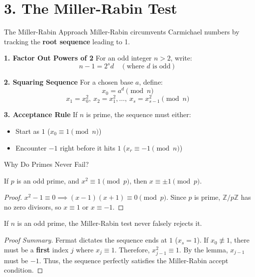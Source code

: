 \documentclass[10pt, compress]{beamer}
\begin{document}
\section{3. The Miller-Rabin Test}
\begin{frame}{The Miller-Rabin Approach}
    Miller-Rabin circumvents Carmichael numbers by tracking the \textbf{root sequence} leading to 1.
    
    \pause
    \textbf{1. Factor Out Powers of 2}
    For an odd integer $n > 2$, write:
    \[ n - 1 = 2^s d \quad (\text{where } d \text{ is odd}) \]
    
    \pause
    \textbf{2. Squaring Sequence}
    For a chosen base $a$, define:
    \[ x_0 = a^d \pmod n \]
    \[ x_1 = x_0^2, \ x_2 = x_1^2, \dots, \ x_s = x_{s-1}^2 \pmod n \]
    
    \pause
    \textbf{3. Acceptance Rule}
    If $n$ is prime, the sequence must either:
    \begin{itemize}
        \item Start as $1$ ($x_0 \equiv 1 \pmod n$)
        \item Encounter $-1$ right before it hits $1$ ($x_r \equiv -1 \pmod n$)
    \end{itemize}
\end{frame}
\begin{frame}{Why Do Primes Never Fail?}
    \begin{lemma}
    If $p$ is an odd prime, and $x^2 \equiv 1 \pmod p$, then $x \equiv \pm 1 \pmod p$.
    \end{lemma}
    
    \pause
    \begin{proof}
        $x^2 - 1 \equiv 0 \implies (x-1)(x+1) \equiv 0 \pmod p$. Since $p$ is prime, $\mathbb{Z}/p\mathbb{Z}$ has no zero divisors, so $x \equiv 1$ or $x \equiv -1$.
    \end{proof}
    
    \pause
    \begin{theorem}
    If $n$ is an odd prime, the Miller-Rabin test never falsely rejects it.
    \end{theorem}
    \pause
    \begin{proof}[Proof Summary]
        Fermat dictates the sequence ends at $1$ ($x_s = 1$). If $x_0 \not\equiv 1$, there must be a \textbf{first} index $j$ where $x_j \equiv 1$. Therefore, $x_{j-1}^2 \equiv 1$. By the lemma, $x_{j-1}$ must be $-1$. Thus, the sequence perfectly satisfies the Miller-Rabin accept condition.
    \end{proof}
\end{frame}
\end{document}
